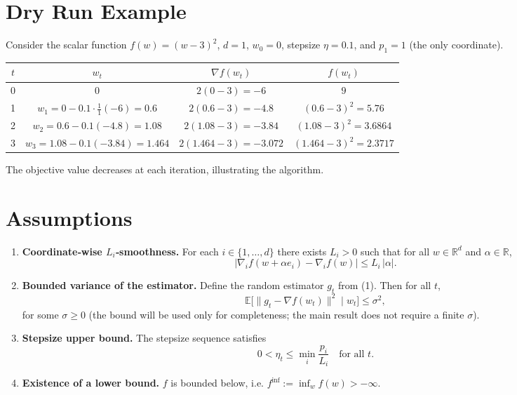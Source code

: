 \documentclass{article}
\newcommand{\EE}{\mathbb{E}}
\newcommand{\RR}{\mathbb{R}}
\begin{document}
\section*{Dry Run Example}
Consider the scalar function $f(w)=(w-3)^2$, $d=1$, $w_0=0$, stepsize $\eta=0.1$, and $p_1=1$ (the only coordinate).

\begin{center}
\begin{tabular}{c|c|c|c}
$t$ & $w_t$ & $\nabla f(w_t)$ & $f(w_t)$\\ \hline
0 & $0$ & $2(0-3)=-6$ & $9$\\
1 & $w_1=0-0.1\cdot\frac{1}{1}(-6)=0.6$ & $2(0.6-3)=-4.8$ & $(0.6-3)^2=5.76$\\
2 & $w_2=0.6-0.1(-4.8)=1.08$ & $2(1.08-3)=-3.84$ & $(1.08-3)^2=3.6864$\\
3 & $w_3=1.08-0.1(-3.84)=1.464$ & $2(1.464-3)=-3.072$ & $(1.464-3)^2=2.3717$
\end{tabular}
\end{center}
The objective value decreases at each iteration, illustrating the algorithm.

\newpage
\section*{Assumptions}
\begin{enumerate}[label=\textbf{A\arabic*.},leftmargin=*,nosep]
\item \textbf{Coordinate‑wise $L_i$‑smoothness.}  
For each $i\in\{1,\dots ,d\}$ there exists $L_i>0$ such that for all $w\in\RR^{d}$ and $\alpha\in\RR$,
\[
\bigl|\nabla_i f(w+\alpha e_i)-\nabla_i f(w)\bigr|
\le L_i\,|\alpha|.
\tag{A1}
\]

\item \textbf{Bounded variance of the estimator.}  
Define the random estimator $g_t$ from (1). Then for all $t$,
\[
\EE\!\bigl[\|g_t-\nabla f(w_t)\|^2\mid w_t\bigr]
\le \sigma^2,
\tag{A2}
\]
for some $\sigma\ge0$ (the bound will be used only for completeness; the main result does not require a finite $\sigma$).

\item \textbf{Stepsize upper bound.}  
The stepsize sequence satisfies
\[
0<\eta_t\le \min_{i}\frac{p_i}{L_i}\quad\text{for all }t.
\tag{A3}
\]

\item \textbf{Existence of a lower bound.}  
$f$ is bounded below, i.e. $f^{\inf}:=\inf_{w}f(w)>-\infty$.
\end{enumerate}
\end{document}
